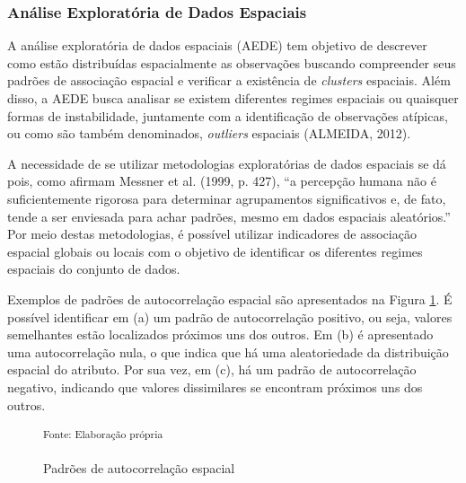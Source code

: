 \documentclass[12pt, a4paper,brazil,oneside]{article}
\begin{document}
	
	\subsubsection{Análise Exploratória de Dados Espaciais}
	
	A análise exploratória de dados espaciais (AEDE) tem objetivo de descrever como estão distribuídas espacialmente as observações buscando compreender seus padrões de associação espacial e verificar a existência de \textit{clusters} espaciais. Além disso, a AEDE busca analisar se existem diferentes regimes espaciais  ou quaisquer formas de instabilidade, juntamente com a identificação de observações atípicas, ou como são também denominados, \textit{outliers} espaciais (ALMEIDA, 2012).
	
	A necessidade de se utilizar metodologias exploratórias de dados espaciais se dá pois, como afirmam Messner et al. (1999, p. 427), “a percepção humana não é suficientemente rigorosa para determinar agrupamentos significativos e, de fato, tende a ser enviesada para achar padrões, mesmo em dados espaciais aleatórios.” Por meio destas metodologias, é possível utilizar indicadores de associação espacial globais ou locais com o objetivo de identificar os diferentes regimes espaciais do conjunto de dados.
	
	Exemplos de padrões de autocorrelação espacial são apresentados na Figura \ref{autocorrelacao}. É possível identificar em (a) um padrão de autocorrelação positivo, ou seja, valores semelhantes estão localizados próximos uns dos outros. Em (b) é apresentado uma autocorrelação nula, o que indica que há uma aleatoriedade da distribuição espacial do atributo. Por sua vez, em (c), há um padrão de autocorrelação negativo, indicando que valores dissimilares se encontram próximos uns dos outros. 
	
	\begin{figure}[h!]
		\centering
		\small
		\hspace{0.2cm}
		\hspace{0.2cm}
		\caption{Padrões de autocorrelação espacial}
		\small \textsuperscript {Fonte: Elaboração própria}
		\label{autocorrelacao}
	\end{figure}
	
\end{document}
